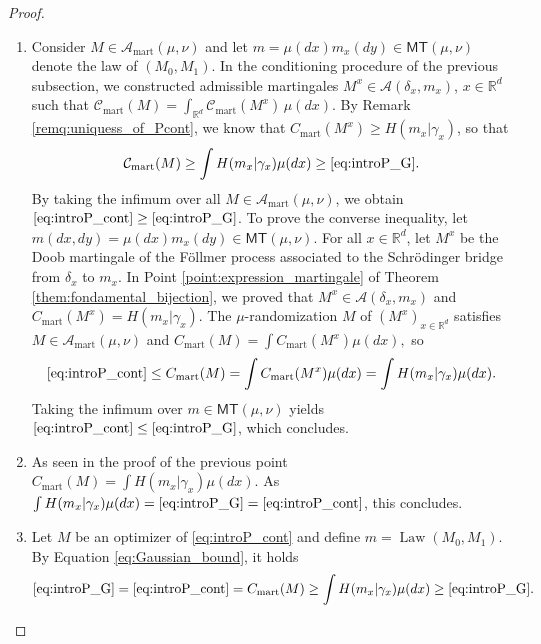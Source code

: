 \documentclass[reqno, a4paper]{amsart}
\theoremstyle{plain}
\theoremstyle{definition}
\theoremstyle{remark}
\numberwithin{equation}{section}
\numberwithin{theorem}{section}
\newcommand{\R}{\mathbb{R}}
\newcommand{\MT}{\mathsf{MT}}
\newcommand{\Law}{\operatorname{Law}}
\begin{document}
	
	\begin{proof}
		\begin{enumerate}
			\item Consider $M \in \mathcal A_{\mathrm{mart}} (\mu,\nu)$ and let  $m = \mu(dx) m_x(dy) \in \MT(\mu,\nu)$ denote the law of $(M_0,M_1)$. In the conditioning procedure of the previous subsection, we constructed admissible martingales $M^x \in \mathcal A (\delta_x, m_x)$, $x \in \R^d$ such that $\mathcal C_{\mathrm{mart}}(M)
			=
			\int_{\R^d} \mathcal C_{\mathrm{mart}}(M^x)\,\mu(dx)$. 
			By Remark \ref{remq:uniquess_of_Pcont}, we know that $C_{\mathrm{mart}}(M^x) \ge H(m_x|\gamma_x)$, so that 
			\begin{equation*}\label{eq:Gaussian_bound}
				\mathcal C_{\mathrm{mart}}(M) \geq \int H(m_x|\gamma_x) \mu(dx) \geq \eqref{eq:introP_G}.
			\end{equation*}
			By taking the infimum over all $M \in \mathcal{A}_{\mathrm{mart}}(\mu,\nu)$, we obtain $\eqref{eq:introP_cont} \geq \eqref{eq:introP_G}$. To prove the converse inequality, let $m(dx,dy) = \mu(dx) m_x(dy) \in \MT(\mu,\nu).$ For all $x \in \R^d$, let $M^x$ be the Doob martingale of the Föllmer process associated to the Schrödinger bridge from $\delta_x$ to $m_x$. In Point \ref{point:expression_martingale} of Theorem \ref{them:fondamental_bijection}, we proved that $M^x \in \mathcal A (\delta_x, m_x)$ and $C_{\mathrm{mart}}(M^x) = H(m_x|\gamma_x).$  The $\mu$-randomization $M$ of $(M^x)_{x \in \R^d}$ satisfies $M \in \mathcal{A}_{\mathrm{mart}}(\mu,\nu)$ and $C_{\mathrm{mart}}(M) = \int C_{\mathrm{mart}}(M^x) \mu(dx),$ so
			\begin{equation}
				\eqref{eq:introP_cont} \leq C_{\mathrm{mart}}(M) = \int C_{\mathrm{mart}}(M^x) \mu(dx) = \int H(m_x|\gamma_x) \mu(dx).
			\end{equation}
			Taking the infimum over $m \in \MT(\mu,\nu)$ yields $\eqref{eq:introP_cont} \leq \eqref{eq:introP_G}$, which concludes.
			\item As seen in the proof of the previous point $ C_{\mathrm{mart}}(M) = \int H(m_x|\gamma_x)\mu(dx).$ As $\int H(m_x|\gamma_x)\mu(dx) = \eqref{eq:introP_G} = \eqref{eq:introP_cont}$, this concludes.
			\item Let $M$ be an optimizer of \eqref{eq:introP_cont} and define $m = \Law(M_0,M_1)$. By Equation \eqref{eq:Gaussian_bound}, it holds
			\begin{equation}\label{eq:sandwich_Gaussian_bound}
				\eqref{eq:introP_G} =\eqref{eq:introP_cont} =  C_{\mathrm{mart}}(M) \geq \int H(m_x|\gamma_x) \mu(dx) \geq \eqref{eq:introP_G}.

\end{equation}
\end{enumerate}
\end{proof}
\end{document}
